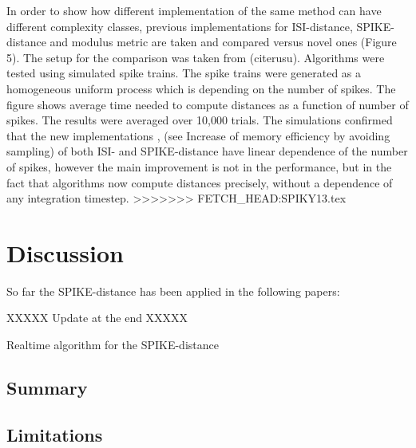 \documentclass[10pt,twocolumn]{elsart5p}
\begin{document}
In order to show how different implementation of the same method can have different complexity classes, previous implementations for ISI-distance, SPIKE-distance and modulus metric are taken and compared versus novel ones (Figure 5). The setup for the comparison was taken from (cite{rusu}). Algorithms were tested using simulated spike trains. The spike trains were generated as a homogeneous uniform process which is depending on the number of spikes. The figure shows average time needed to compute distances as a function of number of spikes. The results were averaged over 10,000 trials. The simulations confirmed that the new 	implementations , (see Increase of memory efficiency by avoiding sampling) of both ISI- and SPIKE-distance have linear dependence of the number of spikes, however the main improvement is not in the performance, but in the fact that algorithms now compute distances precisely, without a dependence of any integration timestep.
>>>>>>> FETCH_HEAD:SPIKY13.tex

%
%
\section{\label{s:Discussion} Discussion}

So far the SPIKE-distance has been applied in the following papers:

\citep{Papoutsi13, DiPoppa13, Rusu14, Sacre14}

XXXXX Update at the end XXXXX

Realtime algorithm for the SPIKE-distance

\subsection{\label{ss:Summary} Summary}

\subsection{\label{ss:Limitations} Limitations}
\end{document}
